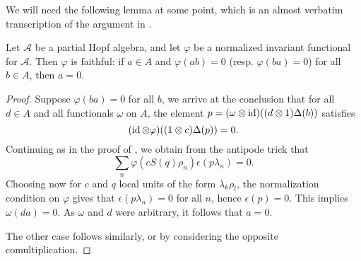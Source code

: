 
 

We will need the following lemma at some point, which is an almost verbatim transcription of the argument in \cite[Proposition 3.4]{VDae2}.

\begin{Lem}\label{LemFaith} Let $\mathscr{A}$ be a partial Hopf algebra, and let $\varphi$ be a normalized invariant functional for $\mathscr{A}$. Then $\varphi$ is faithful: if $a\in A$ and $\varphi(ab) =0$ (resp. $\varphi(ba)=0$) for all $b\in A$, then $a=0$.
\end{Lem} 
\begin{proof} Suppose  $\varphi(ba)=0$ for all $b$, we arrive at the conclusion that for all $d\in A$ and all functionals $\omega$ on $A$, the element $p = (\omega\otimes \operatorname{id})((d\otimes 1)\Delta(b))$ satisfies \[(\operatorname{id}\otimes \varphi)((1\otimes c)\Delta(p)) = 0.\] Continuing as in the proof of \cite[Proposition 3.4]{VDae2}, we obtain from the antipode trick that \[\sum_n \varphi(cS(q)\rho_n)\epsilon(p\lambda_n)=0.\] Choosing now for $c$ and $q$ local units of the form $\lambda_k\rho_l$, the normalization condition on $\varphi$ gives that $\epsilon(p\lambda_n)=0$ for all $n$, hence $\epsilon(p)=0$. This implies $\omega(da)=0$. As $\omega$ and $d$ were arbitrary, it follows that $a=0$.

The other case follows similarly, or by considering the opposite comultiplication.
\end{proof} 





